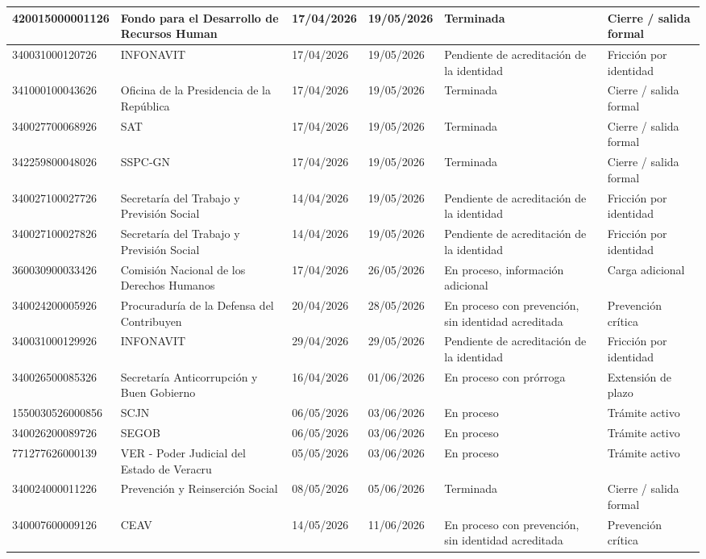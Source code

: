 \documentclass[10pt,letterpaper]{article}
\begin{document}
\begin{longtable}{|p{3.0cm}|p{4.2cm}|p{2.2cm}|p{2.2cm}|p{3.8cm}|p{4.2cm}|}
420015000001126 & Fondo para el Desarrollo de Recursos Human & 17/04/2026 & 19/05/2026 & Terminada & Cierre / salida formal \\ \hline
340031000120726 & INFONAVIT & 17/04/2026 & 19/05/2026 & Pendiente de acreditación de la identidad & Fricción por identidad \\ \hline
341000100043626 & Oficina de la Presidencia de la República & 17/04/2026 & 19/05/2026 & Terminada & Cierre / salida formal \\ \hline
340027700068926 & SAT & 17/04/2026 & 19/05/2026 & Terminada & Cierre / salida formal \\ \hline
342259800048026 & SSPC-GN & 17/04/2026 & 19/05/2026 & Terminada & Cierre / salida formal \\ \hline
340027100027726 & Secretaría del Trabajo y Previsión Social  & 14/04/2026 & 19/05/2026 & Pendiente de acreditación de la identidad & Fricción por identidad \\ \hline
340027100027826 & Secretaría del Trabajo y Previsión Social  & 14/04/2026 & 19/05/2026 & Pendiente de acreditación de la identidad & Fricción por identidad \\ \hline
360030900033426 & Comisión Nacional de los Derechos Humanos  & 17/04/2026 & 26/05/2026 & En proceso, información adicional & Carga adicional \\ \hline
340024200005926 & Procuraduría de la Defensa del Contribuyen & 20/04/2026 & 28/05/2026 & En proceso con prevención, sin identidad acreditada & Prevención crítica \\ \hline
340031000129926 & INFONAVIT & 29/04/2026 & 29/05/2026 & Pendiente de acreditación de la identidad & Fricción por identidad \\ \hline
340026500085326 & Secretaría Anticorrupción y  Buen Gobierno & 16/04/2026 & 01/06/2026 & En proceso con prórroga & Extensión de plazo \\ \hline
1550030526000856 & SCJN & 06/05/2026 & 03/06/2026 & En proceso & Trámite activo \\ \hline
340026200089726 & SEGOB & 06/05/2026 & 03/06/2026 & En proceso & Trámite activo \\ \hline
771277626000139 & VER - Poder Judicial del Estado de Veracru & 05/05/2026 & 03/06/2026 & En proceso & Trámite activo \\ \hline
340024000011226 & Prevención y Reinserción Social & 08/05/2026 & 05/06/2026 & Terminada & Cierre / salida formal \\ \hline
340007600009126 & CEAV & 14/05/2026 & 11/06/2026 & En proceso con prevención, sin identidad acreditada & Prevención crítica \\ \hline

\end{longtable}
\end{document}
